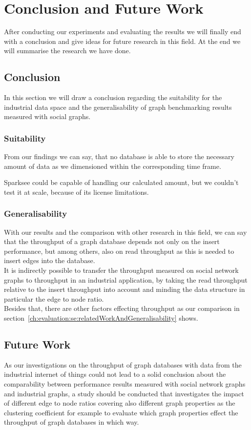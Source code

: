 \chapter{Conclusion and Future Work}
\label{ch:futureWork}
After conducting our experiments and evaluating the results we will finally end with a conclusion and give ideas for future research in this field.
At the end we will summarise the research we have done.

\section{Conclusion}
\label{ch:futureWork:se:conclusion}
In this section we will draw a conclusion regarding the suitability for the industrial data space and the generalisability of graph benchmarking results measured with social graphs.

\subsection{Suitability}
From our findings we can say,
that no database is able to store the necessary amount of data as we dimensioned within the corresponding time frame.

Sparksee could be capable of handling our calculated amount,
but we couldn't test it at scale,
because of its license limitations.

\subsection{Generalisability}
With our results and the comparison with other research in this field,
we can say that the throughput of a graph database depends not only on the insert performance,
but among others,
also on read throughput as this is needed to insert edges into the database.\\
It is indirectly possible to transfer the throughput measured on social network graphs to throughput in an industrial application,
by taking the read throughput relative to the insert throughput into account and minding the data structure in particular the edge to node ratio.\\
Besides that, there are other factors effecting throughput as our comparison in section~\ref{ch:evaluation:se:relatedWorkAndGeneralisability} shows.

\section{Future Work}
As our investigations on the throughput of graph databases with data from the industrial internet of things could not lead to a solid conclusion about the comparability between performance results measured with social network graphs and industrial graphs,
a study should be conducted that investigates the impact of different edge to node ratios covering also different graph properties as the clustering coefficient for example to evaluate which graph properties effect the throughput of graph databases in which way.

